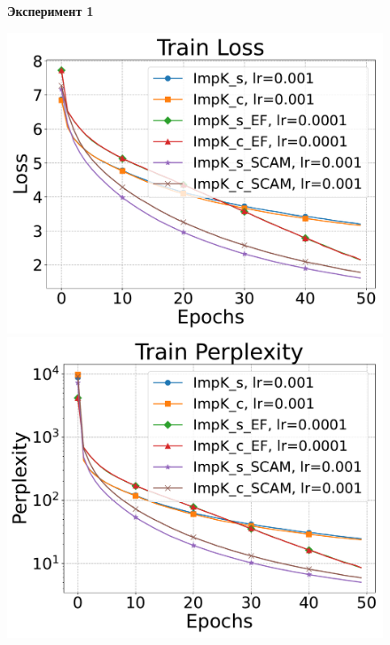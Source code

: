     \begin{figure}[ht]
        \centering
        \textbf{Эксперимент 1}\par\medskip
        \begin{minipage}{0.45\textwidth}
            \includegraphics[width=\textwidth]{figures/gpt2/experiment1/Train Loss.pdf}
        \end{minipage}
        \begin{minipage}{0.45\textwidth}
            \includegraphics[width=\textwidth]{figures/gpt2/experiment1/Train Perplexity.pdf}
        \end{minipage}

\end{figure}
